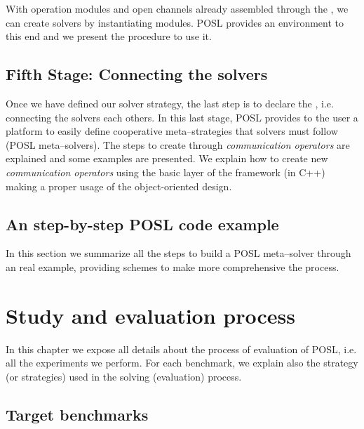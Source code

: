 \documentclass[a4paper]{book} %
\newcommand{\posl}{{\sc POSL}}
\begin{document}
With operation modules and open channels already assembled through the \cstr{}, we can create solvers by instantiating modules. \posl{} provides an environment to this end and we present the procedure to use it. 

\section{Fifth Stage: Connecting the solvers}

Once we have defined our solver strategy, the last step is to declare the \commchs, i.e. connecting the solvers each others. In this last stage, \posl{} provides to the user a platform to easily define cooperative meta--strategies that solvers must follow (\posl{} meta--solvers). The steps to create \commchs{} through \textit{communication operators} are explained and some examples are presented. We explain how to create new \textit{communication operators} using the basic layer of the framework (in C++) making a proper usage of the object-oriented design.

\section{An step-by-step \posl{} code example}

In this section we summarize all the steps to build a \posl{} meta--solver through an real example, providing schemes to make more comprehensive the process.

\chapter{Study and evaluation process}

In this chapter we expose all details about the process of evaluation of \posl{}, i.e. all the experiments we perform. For each benchmark, we explain also the strategy (or strategies) used in the solving (evaluation) process.

\newcommand{\benchbody}[1]{We present in this sub-section the definition, characteristics and some implementation details of the \textit{#1 Problem}. Studied strategies used to evaluate \posl{} through this benchmark are presented and explained in details.}

\section{Target benchmarks}
\end{document}

